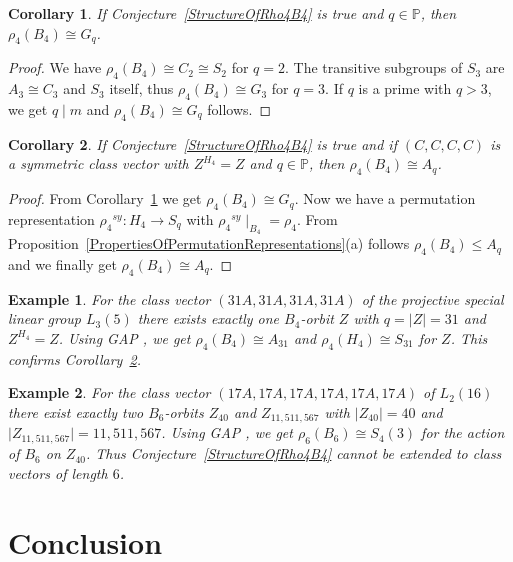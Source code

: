 \documentclass[12pt,a4paper]{article}
\newtheorem{corollary}{Corollary}[section]
\newtheorem{example}{Example}[section]
\numberwithin{equation}{section}
\numberwithin{table}{section}
\begin{document}
%
\begin{corollary}
\label{StructureOfRho4B4PrimeSize}
If Conjecture~\ref{StructureOfRho4B4} is true and $q \in \mathbb{P}$, then $\rho_4(B_4) \cong G_q$.
\end{corollary}
\begin{proof}
We have $\rho_4(B_4) \cong C_2 \cong S_2$ for $q = 2$. The transitive subgroups of $S_3$ are $A_3 \cong C_3$
and $S_3$ itself, thus $\rho_4(B_4) \cong G_3$ for $q = 3$. If $q$ is a prime with $q > 3$, we get $q \mid m$
and $\rho_4(B_4) \cong G_q$ follows.
\end{proof}
%
\begin{corollary}
\label{StructureOfRho4B4PrimeSizeSymmetric}
If Conjecture~\ref{StructureOfRho4B4} is true and if $(C,C,C,C)$ is a symmetric class vector with $Z^{H_4} = Z$
and $q \in \mathbb{P}$, then $\rho_4(B_4) \cong A_q$.
\end{corollary}
\begin{proof}
From Corollary~\ref{StructureOfRho4B4PrimeSize} we get $\rho_4(B_4) \cong G_q$.
Now we have a permutation representation
${\rho_4}^{sy}: H_4 \rightarrow S_q$ with ${\rho_4}^{sy} {\mid}_{B_4} = \rho_4$.
From Proposition~\ref{PropertiesOfPermutationRepresentations}(a) follows $\rho_4(B_4) \leq A_q$
and we finally get $\rho_4(B_4) \cong A_q$.
\end{proof}
%
\begin{example}
\label{L3_5_31A31A31A31A}
For the class vector $(31A,31A,31A,31A)$ of the projective special linear group $L_3(5)$ 
there exists exactly one $B_4$-orbit $Z$ with 
$q = \vert Z \vert = 31$ and $Z^{H_4} = Z$. Using GAP \cite{RefGAP},
we get $\rho_4(B_4) \cong A_{31}$ and $\rho_4(H_4) \cong S_{31}$ for $Z$.
This confirms Corollary~\ref{StructureOfRho4B4PrimeSizeSymmetric}.
\end{example}
%
\begin{example}
\label{L2_16_17A17A17A17A17A17A}
For the class vector $(17A,17A,17A,17A,17A,17A)$ of $L_2(16)$ there exist exactly two $B_6$-orbits $Z_{40}$
and $Z_{11,511,567}$ with $\vert Z_{40} \vert = 40$ and $\vert Z_{11,511,567} \vert = 11,511,567$.
Using GAP \cite{RefGAP}, we get $\rho_6(B_6) \cong  S_4(3)$ for the action of $B_6$ on $Z_{40}$.
Thus Conjecture~\ref{StructureOfRho4B4} cannot be extended to class vectors of length $6$.
\end{example}

\section{Conclusion}\label{SectionConclusion}
\end{document}
